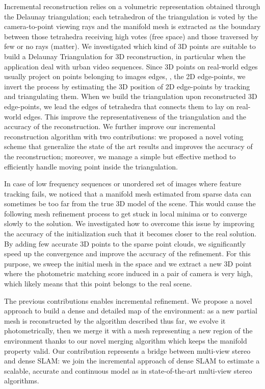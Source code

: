 Incremental reconstruction relies on a volumetric representation obtained through the Delaunay triangulation; each tetrahedron of the triangulation  is voted by the camera-to-point viewing rays and the manifold mesh is extracted as the boundary between those tetrahedra receiving high votes (free space) and those traversed by few or no rays (matter).
We investigated which kind of 3D points are suitable to build a Delaunay Triangulation for 3D reconstruction, in particular when the application deal with urban video sequences.
Since 3D points on real-world edges usually project on  points belonging to images edges, \ie, the 2D edge-points, we invert the process by estimating the 3D position of 2D edge-points by tracking and triangulating them. When we build the triangulation upon reconstructed 3D edge-points, we lead the  edges of tetrahedra that connects them to lay on real-world edges. This improve the representativeness of the triangulation and the accuracy of the reconstruction.
We further improve our incremental reconstruction algorithm with two contributions: we proposed a novel voting scheme that generalize the state of the art results and improves the accuracy of the reconstruction; moreover, we manage a simple but effective method to efficiently handle moving point inside the triangulation.

In case of low frequency sequences or unordered set of images where feature tracking fails, we noticed that a manifold mesh estimated from sparse data can sometimes be too far from the true 3D model of the scene. This would cause the following mesh refinement process to get stuck  in local minima or to converge slowly to the solution.
We investigated how to overcome this issue by improving the accuracy of  the initialization such that it becomes closer to the real solution.
By adding few accurate 3D points to the sparse point clouds, we significantly speed up the convergence and improve the accuracy of the refinement.
For this purpose, we sweep the initial mesh in the space and we extract a new 3D point where the photometric matching score induced in a pair of camera is very high, which likely means that this point belongs to the real scene.

The previous contributions enables incremental refinement. 
We propose a novel approach to build a dense and detailed map of the environment: as a new partial mesh is reconstructed by the algorithm described thus far, we evolve it photometrically, then we merge it with a mesh representing a new region of the environment thanks to our novel merging algorithm which keeps the manifold property valid.
Our contribution represents a bridge between multi-view stereo and 
dense SLAM: we join the incremental approach of dense SLAM to estimate a  scalable, accurate and continuous model as in state-of-the-art multi-view stereo algorithms. 

